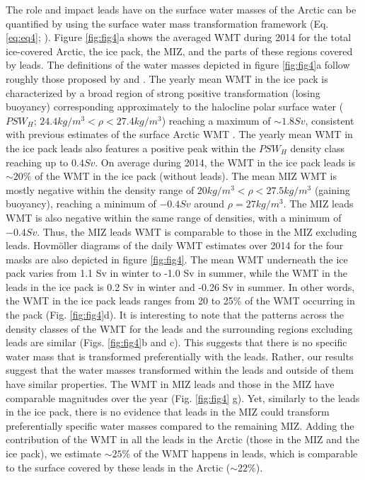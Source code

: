 \documentclass[draft]{agujournal2019}
\begin{document}
The role and impact leads have on the surface water masses of the Arctic can be quantified by using the surface water mass transformation framework (Eq. \ref{eq:eq4}; ). 
Figure \ref{fig:fig4}a shows the averaged WMT during 2014 for the total ice-covered Arctic, the ice pack, the MIZ, and the parts of these regions covered by leads. The definitions of the water masses depicted in figure \ref{fig:fig4}a follow roughly those proposed by  and .
The yearly mean WMT in the ice pack is characterized by a broad region of strong positive transformation (losing buoyancy) corresponding approximately to the halocline polar surface water ($PSW_{H}$; $24.4 kg/m^3 < \rho < 27.4 kg/m^3$) reaching a maximum of $\sim 1.8 Sv$, consistent with previous estimates of the surface Arctic WMT \cite{Pemberton_WMT_2015}.
The yearly mean WMT in the ice pack leads also features a positive peak within the $PSW_{H}$ density class reaching up to $0.4 Sv$. On average during 2014, the WMT in the ice pack leads is $\sim 20\%$ of the WMT in the ice pack (without leads). The mean MIZ WMT is mostly negative within the density range of $20 kg/m^3 < \rho < 27.5 kg/m^3$ (gaining buoyancy), reaching a minimum of $-0.4 Sv$ around $\rho = 27 kg/m^3$. The MIZ leads WMT is also negative within the same range of densities, with a minimum of $-0.4 Sv$. Thus, the MIZ leads WMT is comparable to those in the MIZ excluding leads. 
Hovm\"oller diagrams of the daily WMT estimates over 2014 for the four masks are also depicted in figure \ref{fig:fig4}.
The mean WMT underneath the ice pack varies from 1.1 Sv in winter to -1.0 Sv in summer, while the WMT in the leads in the ice pack is 0.2 Sv in winter and -0.26 Sv in summer. In other words, the WMT in the ice pack leads ranges from 20 to 25\% of the WMT occurring in the pack (Fig. \ref{fig:fig4}d). It is interesting to note that the patterns across the density classes of the WMT for the leads and the surrounding regions excluding leads are similar (Figs. \ref{fig:fig4}b and c). This suggests that there is no specific water mass that is transformed preferentially with the leads. Rather, our results suggest that the water masses transformed within the leads and outside of them have similar properties. 
The WMT in MIZ leads and those in the MIZ have comparable magnitudes over the year (Fig. \ref{fig:fig4} g). Yet, similarly to the leads in the ice pack, there is no evidence that leads in the MIZ could transform preferentially specific water masses compared to the remaining MIZ. 
Adding the contribution of the WMT in all the leads in the Arctic (those in the MIZ and the ice pack), we estimate $\sim 25\%$ of the WMT happens in leads, which is comparable to the surface covered by these leads in the Arctic ($\sim 22\%$).
\end{document}
